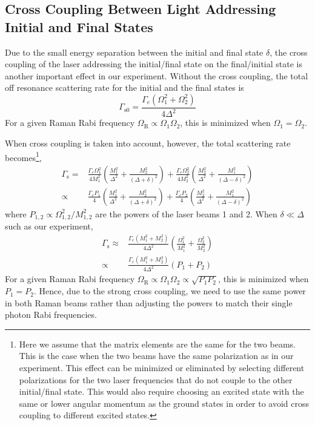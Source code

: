 \subsection{Cross Coupling Between Light Addressing Initial and Final States}
\label{ch:raman-transfer:raman:cross-couple}

Due to the small energy separation between the initial and final state $\delta$,
the cross coupling of the laser addressing the initial/final state on the final/initial state
is another important effect in our experiment.
Without the cross coupling, the total off resonance scattering rate for
the initial and the final states is
\[
  \Gamma_{\mathrm{s}0}=\frac{\Gamma_e\left(\Omega_1^2+\Omega_2^2\right)}{4\Delta^2}
\]
For a given Raman Rabi frequency $\Omega_{\mathrm{R}}\propto\Omega_1\Omega_2$, this is
minimized when $\Omega_1=\Omega_2$.

When cross coupling is taken into account, however, the total scattering rate becomes\footnote{
  Here we assume that the matrix elements are the same for the two beams.
  This is the case when the two beams have the same polarization as in our experiment.
  This effect can be minimized or eliminated by selecting different polarizations for the
  two laser frequencies that do not couple to the other initial/final state.
  This would also require choosing an excited state with the same or lower angular momentum
  as the ground states in order to avoid cross coupling to different excited states.},
\begin{align}
  \Gamma_{\mathrm{s}}=&\frac{\Gamma_e\Omega_1^2}{4M_1^2}\left(\frac{M_1^2}{\Delta^2}+\frac{M_2^2}{(\Delta+\delta)^2}\right)+\frac{\Gamma_e\Omega_2^2}{4M_2^2}\left(\frac{M_2^2}{\Delta^2}+\frac{M_1^2}{(\Delta-\delta)^2}\right)\\
  \propto&\frac{\Gamma_eP_1}{4}\left(\frac{M_1^2}{\Delta^2}+\frac{M_2^2}{(\Delta+\delta)^2}\right)+\frac{\Gamma_eP_2}{4}\left(\frac{M_2^2}{\Delta^2}+\frac{M_1^2}{(\Delta-\delta)^2}\right)
\end{align}
where $P_{1,2}\propto\Omega_{1,2}^2/M_{1,2}^2$ are the powers of the laser beams 1 and 2.
When $\delta\ll\Delta$ such as our experiment,
\begin{align*}
  \Gamma_{\mathrm{s}}\approx&\frac{\Gamma_e\left(M_1^2+M_2^2\right)}{4\Delta^2}\left(\frac{\Omega_1^2}{M_1^2}+\frac{\Omega_2^2}{M_2^2}\right)\\
  \propto&\frac{\Gamma_e\left(M_1^2+M_2^2\right)}{4\Delta^2}\left(P_1+P_2\right)
\end{align*}
For a given Raman Rabi frequency $\Omega_{\mathrm{R}}\propto\Omega_1\Omega_2\propto\sqrt{P_1P_2}$,
this is minimized when $P_1=P_2$.
Hence, due to the strong cross coupling, we need to use the same power in both Raman beams
rather than adjusting the powers to match their single photon Rabi frequencies.

